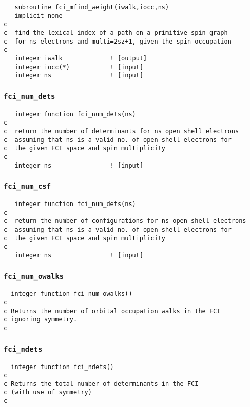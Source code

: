 \documentclass[fullpage,12pt,fleqn]{article}
\begin{document}
\begin{verbatim}
   subroutine fci_mfind_weight(iwalk,iocc,ns)
   implicit none
c     
c  find the lexical index of a path on a primitive spin graph
c  for ns electrons and multi=2sz+1, given the spin occupation
c     
   integer iwalk             ! [output]
   integer iocc(*)           ! [input]
   integer ns                ! [input]
\end{verbatim}

\subsubsection{{\tt fci\_num\_dets}}
\label{sec:fcinumdets}
\begin{verbatim}
   integer function fci_num_dets(ns)
c
c  return the number of determinants for ns open shell electrons
c  assuming that ns is a valid no. of open shell electrons for
c  the given FCI space and spin multiplicity
c
   integer ns                ! [input]
\end{verbatim}

\subsubsection{{\tt fci\_num\_csf}}
\begin{verbatim}
   integer function fci_num_dets(ns)
c
c  return the number of configurations for ns open shell electrons
c  assuming that ns is a valid no. of open shell electrons for
c  the given FCI space and spin multiplicity
c
   integer ns                ! [input]
\end{verbatim}

\subsubsection{{\tt fci\_num\_owalks}}
\begin{verbatim}
  integer function fci_num_owalks()
c
c Returns the number of orbital occupation walks in the FCI
c ignoring symmetry.
c
\end{verbatim}

\subsubsection{{\tt fci\_ndets}}
\begin{verbatim}
  integer function fci_ndets()
c
c Returns the total number of determinants in the FCI
c (with use of symmetry)
c
\end{verbatim}
\end{document}
